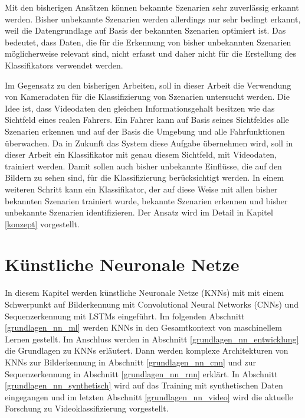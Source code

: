 Mit den bisherigen Ansätzen können bekannte Szenarien sehr zuverlässig erkannt werden. Bisher unbekannte Szenarien werden allerdings nur sehr bedingt erkannt, weil die Datengrundlage auf Basis der bekannten Szenarien optimiert ist. Das bedeutet, dass Daten, die für die Erkennung von bisher unbekannten Szenarien möglicherweise relevant sind, nicht erfasst und daher nicht für die Erstellung des Klassifikators verwendet werden.

Im Gegensatz zu den bisherigen Arbeiten, soll in dieser Arbeit die Verwendung von Kameradaten für die Klassifizierung von Szenarien untersucht werden. Die Idee ist, dass Videodaten den gleichen Informationsgehalt besitzen wie das Sichtfeld eines realen Fahrers. Ein Fahrer kann auf Basis seines Sichtfeldes alle Szenarien erkennen und auf der Basis die Umgebung und alle Fahrfunktionen überwachen. Da in Zukunft das System diese Aufgabe übernehmen wird, soll in dieser Arbeit ein Klassifikator mit genau diesem Sichtfeld, mit Videodaten, trainiert werden. Damit sollen auch bisher unbekannte Einflüsse, die auf den Bildern zu sehen sind, für die Klassifizierung berücksichtigt werden. In einem weiteren Schritt kann ein Klassifikator, der auf diese Weise mit allen bisher bekannten Szenarien trainiert wurde, bekannte Szenarien erkennen und bisher unbekannte Szenarien identifizieren. Der Ansatz wird im Detail in Kapitel \ref{konzept} vorgestellt.

\section{Künstliche Neuronale Netze}
\label{grundlagen_nn}

In diesem Kapitel werden künstliche Neuronale Netze (\acp{KNN}) mit mit einem Schwerpunkt auf Bilderkennung mit Convolutional Neural Networks (\acp{CNN}) und Sequenzerkennung mit \acp{LSTM} eingeführt. Im folgenden Abschnitt \ref{grundlagen_nn_ml} werden \acp{KNN} in den Gesamtkontext von maschinellem Lernen gestellt. Im Anschluss werden in Abschnitt \ref{grundlagen_nn_entwicklung} die Grundlagen zu \acp{KNN} erläutert. Dann werden komplexe Architekturen von \acp{KNN} zur Bilderkennung in Abschnitt \ref{grundlagen_nn_cnn} und zur Sequenzerkennung in Abschnitt \ref{grundlagen_nn_rnn} erklärt. In Abschnitt \ref{grundlagen_nn_synthetisch} wird auf das Training mit synthetischen Daten eingegangen und im letzten Abschnitt \ref{grundlagen_nn_video} wird die aktuelle Forschung zu Videoklassifizierung vorgestellt.

